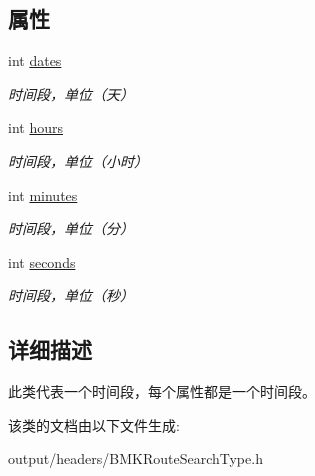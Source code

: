 \subsection*{属性}
\begin{DoxyCompactItemize}
\item 
\hypertarget{interface_b_m_k_time_a24bb65125c9fd504229a04e616130cb1}{}int \hyperlink{interface_b_m_k_time_a24bb65125c9fd504229a04e616130cb1}{dates}\label{interface_b_m_k_time_a24bb65125c9fd504229a04e616130cb1}

\begin{DoxyCompactList}\small\item\em 时间段，单位（天） \end{DoxyCompactList}\item 
\hypertarget{interface_b_m_k_time_ae91ad4ffdcb6c8c42a5477199e4947f8}{}int \hyperlink{interface_b_m_k_time_ae91ad4ffdcb6c8c42a5477199e4947f8}{hours}\label{interface_b_m_k_time_ae91ad4ffdcb6c8c42a5477199e4947f8}

\begin{DoxyCompactList}\small\item\em 时间段，单位（小时） \end{DoxyCompactList}\item 
\hypertarget{interface_b_m_k_time_a8c39c525065b0fef0983a0feddae471d}{}int \hyperlink{interface_b_m_k_time_a8c39c525065b0fef0983a0feddae471d}{minutes}\label{interface_b_m_k_time_a8c39c525065b0fef0983a0feddae471d}

\begin{DoxyCompactList}\small\item\em 时间段，单位（分） \end{DoxyCompactList}\item 
\hypertarget{interface_b_m_k_time_a66d0a1c9418ef56ef10ad023513c0f95}{}int \hyperlink{interface_b_m_k_time_a66d0a1c9418ef56ef10ad023513c0f95}{seconds}\label{interface_b_m_k_time_a66d0a1c9418ef56ef10ad023513c0f95}

\begin{DoxyCompactList}\small\item\em 时间段，单位（秒） \end{DoxyCompactList}\end{DoxyCompactItemize}


\subsection{详细描述}
此类代表一个时间段，每个属性都是一个时间段。 

该类的文档由以下文件生成\+:\begin{DoxyCompactItemize}
\item 
output/headers/B\+M\+K\+Route\+Search\+Type.\+h\end{DoxyCompactItemize}
